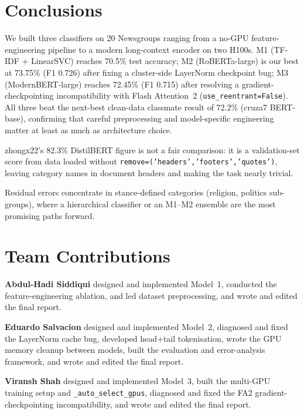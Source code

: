 \documentclass[11pt]{article}
\begin{document}
\section{Conclusions}

We built three classifiers on 20 Newsgroups ranging from a no-GPU
feature-engineering pipeline to a modern long-context encoder on two
H100s.  M1 (TF-IDF + LinearSVC) reaches 70.5\% test accuracy; M2
(RoBERTa-large) is our best at 73.75\% (F1 0.726) after fixing a
cluster-side LayerNorm checkpoint bug; M3 (ModernBERT-large) reaches
72.45\% (F1 0.715) after resolving a gradient-checkpointing
incompatibility with Flash Attention~2 (\texttt{use\_reentrant=False}).
All three beat the next-best clean-data classmate result of 72.2\%
(cruza7 BERT-base), confirming that careful preprocessing and
model-specific engineering matter at least as much as architecture
choice.

zhongx22's 82.3\% DistilBERT figure is not a fair comparison: it is a
validation-set score from data loaded without
\texttt{remove=('headers','footers','quotes')}, leaving category names
in document headers and making the task nearly trivial.

Residual errors concentrate in stance-defined categories (religion,
politics sub-groups), where a hierarchical classifier or an M1--M2
ensemble are the most promising paths forward.

\section*{Team Contributions}

\textbf{Abdul-Hadi Siddiqui} designed and implemented Model~1,
conducted the feature-engineering ablation, and led dataset
preprocessing, and wrote
and edited the final report.

\textbf{Eduardo Salvacion} designed and implemented Model~2, diagnosed
and fixed the LayerNorm cache bug, developed head+tail tokenisation,
wrote the GPU memory cleanup between models, built the evaluation
and error-analysis framework, and wrote
and edited the final report.

\textbf{Viransh Shah} designed and implemented Model~3, built the
multi-GPU training setup and \texttt{\_auto\_select\_gpus}, diagnosed
and fixed the FA2 gradient-checkpointing incompatibility, and wrote
and edited the final report.


\end{document}
